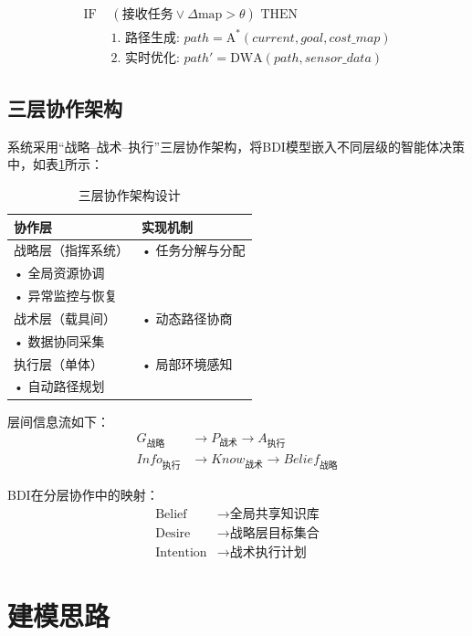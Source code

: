 \documentclass[12pt,a4paper]{article}
\begin{document}
\begin{align}
\text{IF } &(\text{接收任务} \vee \Delta \text{map} > \theta) \text{ THEN} \\
&\text{1. 路径生成: } path = \text{A}^{*}(current, goal, cost\_map) \\
&\text{2. 实时优化: } path' = \text{DWA}(path, sensor\_data)
\end{align}

\subsection{三层协作架构}

系统采用“战略–战术–执行”三层协作架构，将BDI模型嵌入不同层级的智能体决策中，如表\ref{tab:cooperation-architecture}所示：

\begin{table}[h]
\centering
\caption{三层协作架构设计}
\label{tab:cooperation-architecture}
\begin{tabular}{|>{\centering\arraybackslash}p{3.5cm}|>{\raggedright\arraybackslash}p{10cm}|}
\hline
\textbf{协作层} & \textbf{实现机制} \\
\hline
\rowcolor{lightgray}
战略层（指挥系统） & 
• 任务分解与分配\\
• 全局资源协调\\
• 异常监控与恢复\\
\hline
战术层（载具间） & 
• 动态路径协商\\
• 数据协同采集\\
\hline
\rowcolor{lightgray}
执行层（单体） & 
• 局部环境感知\\
• 自动路径规划\\
\hline
\end{tabular}
\end{table}

层间信息流如下：
\begin{align}
G_{战略} &\rightarrow P_{战术} \rightarrow A_{执行} \\
Info_{执行} &\rightarrow Know_{战术} \rightarrow Belief_{战略}
\end{align}

BDI在分层协作中的映射：
\begin{align}
\text{Belief} &\rightarrow \text{全局共享知识库} \\
\text{Desire} &\rightarrow \text{战略层目标集合} \\
\text{Intention} &\rightarrow \text{战术执行计划}
\end{align}

\section{建模思路}
\end{document}
